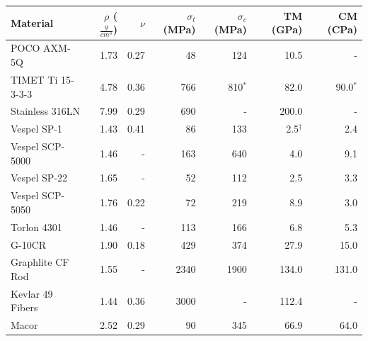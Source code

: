 \documentclass[final]{svjour2}
\begin{document}
\begin{table}[htb]%
\begin{tabular}{lrrrrrr}
\toprule
\textbf{Material} & $\rho$ ($\frac{g}{cm^3}$) & $\nu$ & $\sigma_{t}$ (MPa) & $\sigma_{c}$ (MPa) & TM (GPa) & CM (CPa) \\
\midrule
 POCO AXM-5Q & 1.73 & 0.27 & 48 & 124\phantom{$^*$} & 10.5\phantom{$^{\dag}$} & -\phantom{$^*$} \\
 TIMET Ti 15-3-3-3 & 4.78 & 0.36 & 766 & 810$^*$ & 82.0\phantom{$^{\dag}$} & 90.0$^*$ \\
 Stainless 316LN & 7.99 & 0.29 & 690 & -\phantom{$^*$} & 200.0\phantom{$^{\dag}$} & -\phantom{$^*$} \\
 Vespel SP-1 & 1.43 & 0.41 & 86 & 133\phantom{$^*$} & 2.5$^{\dag}$ & 2.4\phantom{$^*$} \\
 Vespel SCP-5000 & 1.46 & - & 163 & 640\phantom{$^*$} & 4.0\phantom{$^{\dag}$} & 9.1\phantom{$^*$} \\
 Vespel SP-22 & 1.65 & - & 52 & 112\phantom{$^*$} & 2.5\phantom{$^{\dag}$} & 3.3\phantom{$^*$} \\
 Vespel SCP-5050 & 1.76 & 0.22 & 72 & 219\phantom{$^*$} & 8.9\phantom{$^{\dag}$} & 3.0\phantom{$^*$} \\
 Torlon 4301 & 1.46 & - & 113 & 166\phantom{$^*$} & 6.8\phantom{$^{\dag}$} & 5.3\phantom{$^*$} \\
 G-10CR & 1.90 & 0.18 & 429 & 374\phantom{$^*$} & 27.9\phantom{$^{\dag}$} & 15.0\phantom{$^*$} \\
 Graphlite CF Rod & 1.55 & -  & 2340 & 1900\phantom{$^*$} & 134.0\phantom{$^{\dag}$} & 131.0\phantom{$^*$} \\
 Kevlar 49 Fibers & 1.44 & 0.36 & 3000 & -\phantom{$^*$} & 112.4\phantom{$^{\dag}$} & -\phantom{$^*$} \\
 Macor & 2.52 & 0.29 & 90 & 345\phantom{$^*$} & 66.9\phantom{$^{\dag}$} & 64.0\phantom{$^*$} \\


\end{tabular}
\end{table}
\end{document}
